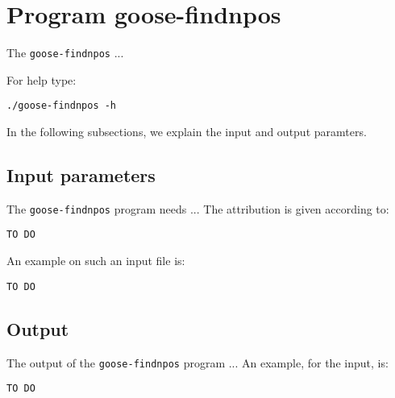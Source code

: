 \section{Program goose-findnpos}
The \texttt{goose-findnpos} ...

For help type:
\begin{lstlisting}
./goose-findnpos -h
\end{lstlisting}
In the following subsections, we explain the input and output paramters.

\subsection{Input parameters}

The \texttt{goose-findnpos} program needs ...
The attribution is given according to:
\begin{lstlisting}
TO DO
\end{lstlisting}

An example on such an input file is:
\begin{lstlisting}
TO DO
\end{lstlisting}

\subsection{Output}
The output of the \texttt{goose-findnpos} program ...
An example, for the input, is:
\begin{lstlisting}
TO DO
\end{lstlisting}
